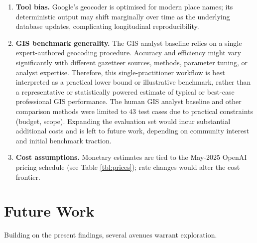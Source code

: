 \begin{enumerate}
  Tokenization/decoding and tool‑call semantics differ across providers
  even when hyperparameters share names, so mixing vendors would add
  noise and weaken internal validity for accuracy/cost/latency
  comparisons. Generalization to other families (e.g., Llama, Mistral)
  is left to future replication under matched settings.
\item
  \textbf{Tool bias.} Google's geocoder is optimised for modern place
  names; its deterministic output may shift marginally over time as the
  underlying database updates, complicating longitudinal
  reproducibility.
\item
  \textbf{GIS benchmark generality.} The GIS analyst baseline
  \citep{Bashorun2025_gis} relies on a single expert-authored geocoding
  procedure. Accuracy and efficiency might vary significantly with
  different gazetteer sources, methods, parameter tuning, or analyst
  expertise. Therefore, this single-practitioner workflow is best
  interpreted as a practical lower bound or illustrative benchmark,
  rather than a representative or statistically powered estimate of
  typical or best-case professional GIS performance. The human GIS
  analyst baseline and other comparison methods were limited to 43 test
  cases due to practical constraints (budget, scope). Expanding the
  evaluation set would incur substantial additional costs and is left to
  future work, depending on community interest and initial benchmark
  traction.
\item
  \textbf{Cost assumptions.} Monetary estimates are tied to the May-2025
  OpenAI pricing schedule (see Table \ref{tbl:prices}); rate changes
  would alter the cost frontier.
\end{enumerate}

\section{Future Work}\label{future-work}

Building on the present findings, several avenues warrant exploration.

